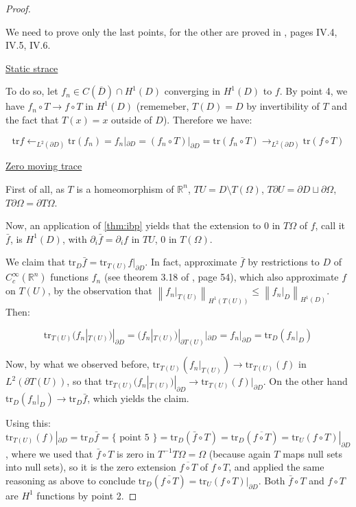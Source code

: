 \documentclass[english,a4paper,12pt,oneside]{scrbook}
\theoremstyle{break}
\newenvironment{mproof}[1][\proofname]{%
  \begin{proof}[#1]$ $\par\nobreak\ignorespaces
}{%
  \end{proof}
}
\renewcommand*{\proofname}{Proof}
\theoremstyle{remark}
\newcommand{\mR}{\mathbb{R}}
\newcommand{\norm}[1]{\left\lVert#1\right\rVert}
\newcommand{\tr}{\text{tr}}
\newcommand{\ind}[1]{\{\text{ #1 }\}}
\begin{document}
\begin{mproof}

We need to prove only the last points, for the other are proved in \cite{murat}, pages IV.4, IV.5, IV.6.

\underline{Static strace}

To do so, let $f_n \in C(\overline{D})\cap H^1(D)$ converging in $H^1(D)$ to $f$. By point 4, we have $f_n \circ T\rightarrow f\circ T$ in $H^1(D)$ (rememeber, $T(D)=D$ by invertibility of $T$ and the fact that $T(x)=x$ outside of $D$). Therefore we have:

$$\tr f \leftarrow_{L^2(\partial D)}\tr(f_n) = f_n|_{\partial D} = (f_n\circ T)|_{\partial D}= \tr(f_n \circ T)\rightarrow_{L^2(\partial D)} \tr(f \circ T)$$

\underline{Zero moving trace}

First of all, as $T$ is a homeomorphism of $\mR^{n}$, $TU=D\setminus T(\Omega)$, $T\partial U = \partial D \sqcup \partial \Omega$, $T\partial \Omega = \partial T \Omega$.

Now, an application of \cref{thm:ibp} yields that the extension to $0$ in $T\Omega$ of $f$, call it $\bar{f}$, is $H^1(D)$, with $\partial_i \bar{f}=\partial_i f$ in $TU$, $0$ in $T(\Omega)$.

We claim that $\tr_D \bar{f} = \tr_{T(U)} f|_{\partial D}$. In fact, approximate $\bar{f}$ by restrictions to $D$ of $C^\infty_c(\mR^n)$ functions $f_n$ (see theorem 3.18 of \cite{adams}, page 54), which also approximate $f$ on ${T(U)}$, by the observation that $\norm{f_n|_{T(U)}}_{H^1({T(U)})}\leq \norm{f_n|_D}_{H^1(D)}$. Then:

$$\tr_{T(U)}( f_n|_{T(U)})|_{\partial D} = (f_n|_{T(U)})|_{\partial {T(U)}}|_{\partial D} = f_n|_{\partial D} = \tr_D ( f_n|_D ) $$

Now, by what we observed before, $\tr_{T(U)}( f_n|_{T(U)})\rightarrow \tr_{T(U)}(f) $ in $L^2(\partial {T(U)})$, so that $\tr_{T(U)}( f_n|_{T(U)})|_{\partial D} \rightarrow \tr_{T(U)}( f)|_{\partial D}$. On the other hand $\tr_D ( f_n|_D ) \rightarrow \tr_D \bar{f}$, which yields the claim.

Using this: $ \tr_{T(U)}( f)|_{\partial D} = \tr_D \bar{f} = \ind{point 5} = \tr_D(\bar{f}\circ T) = \tr_D(\overline{f \circ T}) = \tr_U (f\circ T)|_{\partial D}$, where we used that $\bar{f}\circ T$ is zero in $T^{-1}T\Omega = \Omega$ (because again $T$ maps null sets into null sets), so it is the zero extension $\overline{f \circ T}$ of $f\circ T$, and applied the same reasoning as above to conclude $\tr_D(\overline{f \circ T}) = \tr_U (f\circ T)|_{\partial D}$. Both $\bar{f}\circ T$ and $f\circ T$ are $H^1$ functions by point 2.


\end{mproof}
\end{document}
